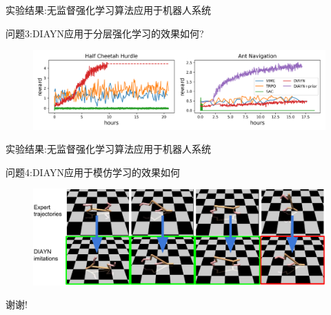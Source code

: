 \documentclass{beamer}
\begin{document}
\begin{frame}{实验结果:无监督强化学习算法应用于机器人系统}
\begin{block}{问题3:DIAYN应用于分层强化学习的效果如何?}
\begin{figure}[htpb]
\begin{center}
    \includegraphics[width=1\linewidth]{pic/hierarchy_rewards.png}
\end{center}
\end{figure}
\end{block}
\end{frame}

\begin{frame}{实验结果:无监督强化学习算法应用于机器人系统}
\begin{block}{问题4:DIAYN应用于模仿学习的效果如何}
\begin{figure}[htpb]
\begin{center}
    \includegraphics[width=1\linewidth]{pic/cheetah_imitation.pdf}
\end{center}
\end{figure}
\end{block}
\end{frame}

\begin{frame}{}
\begin{center}
    \Huge{谢谢!}
\end{center}
\end{frame}
\end{document}
